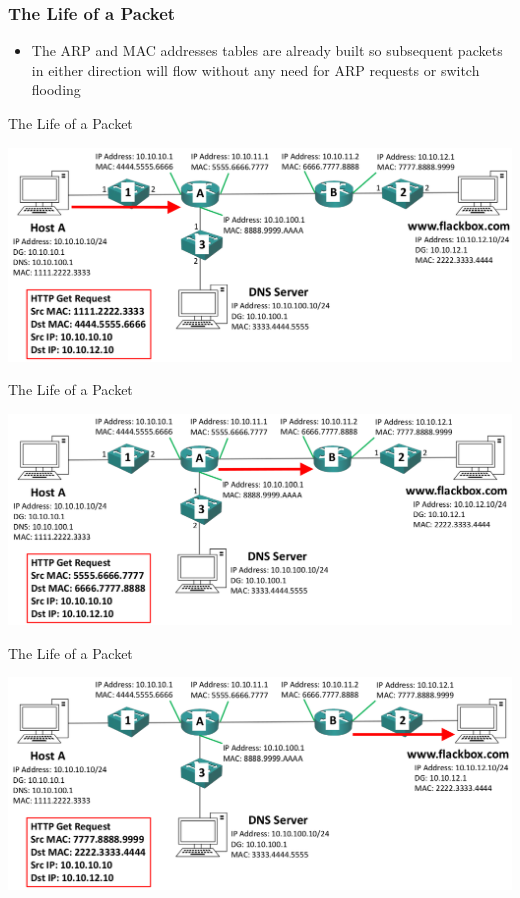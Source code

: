 \documentclass[pdflatex,compress,mathserif]{beamer}
\begin{document}
\begin{frame}
	\frametitle{The Life of a Packet}
	\begin{itemize}
		\item The ARP and MAC addresses tables are already built so subsequent packets in either direction will flow without any need for ARP requests
		or switch flooding
	\end{itemize}
\end{frame}

\begin{frame}{The Life of a Packet}
	\begin{center}
		\includegraphics[width=\linewidth]{img/img62}
	\end{center}
\end{frame}

\begin{frame}{The Life of a Packet}
	\begin{center}
		\includegraphics[width=\linewidth]{img/img63}
	\end{center}
\end{frame}

\begin{frame}{The Life of a Packet}
	\begin{center}
		\includegraphics[width=\linewidth]{img/img64}
	\end{center}
\end{frame}
\end{document}
